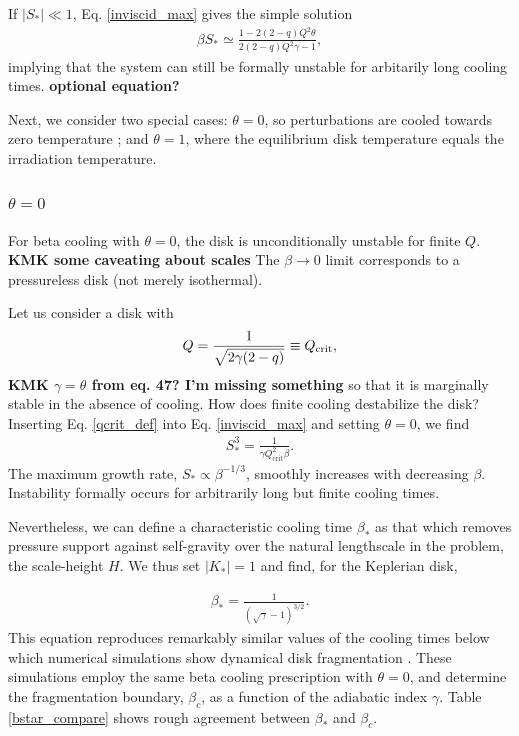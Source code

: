 If $|S_*|\ll1$, Eq. \ref{inviscid_max} gives the simple solution 
\begin{align}
 \beta S_*\simeq \frac{1-2(2-q)Q^2\theta}{2(2-q)Q^2\gamma-1},
\end{align}
implying that the system can still be formally unstable for arbitarily 
long cooling times. {\bf optional equation?}  

Next, we consider two special cases: $\theta=0$, so perturbations are
cooled towards zero temperature \citep[typically employed in
numerical simulations, e.g.][]{gammie01}; and $\theta=1$, where the
equilibrium disk temperature equals the irradiation temperature.  

\subsubsection{$\theta = 0$}\label{theta0}
For beta cooling with $\theta=0$, the disk is unconditionally unstable
for finite $Q$. {\bf KMK some caveating about scales}  The $\beta\to0$ limit corresponds to a 
pressureless disk (not merely isothermal).   

Let us consider a disk with 
\begin{align}\label{qcrit_def}
  Q = \frac{1}{\sqrt{2\gamma(2-q)}}\equiv Q_{\mathrm{crit}},
\end{align} 
{\bf KMK $\gamma = \theta$ from eq. 47? I'm missing something}
so that it is marginally stable in the absence of cooling.  
How does finite cooling destabilize the disk?  
Inserting Eq. \ref{qcrit_def} into Eq. \ref{inviscid_max} and setting
$\theta=0$, we find 
\begin{align}\label{sstar}
  S_*^3 = \frac{1}{\gamma Q_\mathrm{crit}^2 \beta}. 
\end{align}
The maximum growth rate, $S_*\propto \beta^{-1/3}$, smoothly
increases with decreasing $\beta$. Instability formally occurs for
arbitrarily long but finite cooling times. 

Nevertheless, we can define a characteristic cooling
time $\beta_*$ as that which removes pressure support against
self-gravity over the natural lengthscale in the problem, the
scale-height $H$. We thus set $|K_*|=1$ and find, for the Keplerian
disk,  

\begin{align}\label{betastar}
  \beta_* = \frac{1}{\left(\sqrt{\gamma} - 1\right)^{3/2}}. 
\end{align}
This equation reproduces remarkably similar values 
of the cooling times below which 
numerical simulations show dynamical disk fragmentation 
\citep{gammie01,rice05,rice11}. These simulations employ the same beta  
cooling prescription with $\theta=0$, and determine the fragmentation
boundary, $\beta_c$, as a function of the adiabatic index $\gamma$.  
Table \ref{bstar_compare} shows rough agreement between $\beta_*$ and 
$\beta_c$.  


